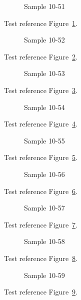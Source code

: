 \begin{figure}[tbhp]
\caption{Sample 10-51}
\label{fig:sample-10-51}
\end{figure}

Test reference Figure~\ref{fig:sample-10-51}.

\begin{figure}[tbhp]
\caption{Sample 10-52}
\label{fig:sample-10-52}
\end{figure}

Test reference Figure~\ref{fig:sample-10-52}.

\begin{figure}[tbhp]
\caption{Sample 10-53}
\label{fig:sample-10-53}
\end{figure}

Test reference Figure~\ref{fig:sample-10-53}.

\begin{figure}[tbhp]
\caption{Sample 10-54}
\label{fig:sample-10-54}
\end{figure}

Test reference Figure~\ref{fig:sample-10-54}.

\begin{figure}[tbhp]
\caption{Sample 10-55}
\label{fig:sample-10-55}
\end{figure}

Test reference Figure~\ref{fig:sample-10-55}.

\begin{figure}[tbhp]
\caption{Sample 10-56}
\label{fig:sample-10-56}
\end{figure}

Test reference Figure~\ref{fig:sample-10-56}.

\begin{figure}[tbhp]
\caption{Sample 10-57}
\label{fig:sample-10-57}
\end{figure}

Test reference Figure~\ref{fig:sample-10-57}.

\begin{figure}[tbhp]
\caption{Sample 10-58}
\label{fig:sample-10-58}
\end{figure}

Test reference Figure~\ref{fig:sample-10-58}.

\begin{figure}[tbhp]
\caption{Sample 10-59}
\label{fig:sample-10-59}
\end{figure}

Test reference Figure~\ref{fig:sample-10-59}.

